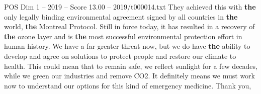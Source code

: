 \begin{textsample}{POS Dim 1 – 2019 – Score 13.00 – 2019/t000014.txt}
They achieved this with \textbf{the} only legally binding environmental agreement signed by all countries in \textbf{the} world, \textbf{the} Montreal Protocol.
Still in force today, it has resulted in a recovery of \textbf{the} ozone layer and is \textbf{the} most successful environmental protection effort in human history.
We have a far greater threat now, but we do have \textbf{the} ability to develop and agree on solutions to protect people and restore our climate to health.
This could mean that to remain safe, we reflect sunlight for a few decades, while we green our industries and remove CO2.
It definitely means we must work now to understand our options for this kind of emergency medicine.
Thank you,

\end{textsample}
